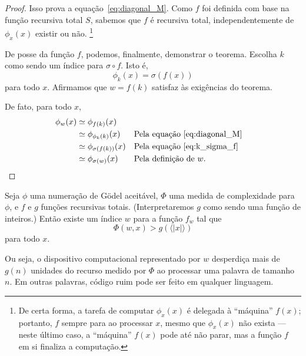 \begin{proof}
    Isso prova a equação~\ref{eq:diagonal_M}.
    Como $f$ foi definida com base na função recursiva total $S$,
    sabemos que $f$ é recursiva total,
    independentemente de $\phi_x(x)$ existir ou não.
    \footnote{
        De certa forma,
        a tarefa de computar $\phi_x(x)$ é delegada à ``máquina'' $f(x)$;
        portanto, $f$ sempre para ao processar $x$,
        mesmo que $\phi_x(x)$ não exista
        --- neste último caso, a ``máquina'' $f(x)$ pode até não parar,
        mas a função $f$ em si finaliza a computação.
    }

    De posse da função $f$,
    podemos, finalmente, demonstrar o teorema.
    Escolha $k$ como sendo um índice para $\sigma \circ f$.
    Isto é,
    \begin{equation}
        \phi_k(x) = \sigma(f(x))
        \label{eq:k_sigma_f}
    \end{equation}
    para todo $x$.
    Afirmamos que $w = f(k)$
    satisfaz às exigências do teorema.

    De fato, para todo $x$,
    \begin{align*}
        \phi_w(x) &\simeq \phi_{f(k)}(x) \\
              &\simeq \phi_{\phi_k(k)}(x) && \text{Pela equação~\ref{eq:diagonal_M}}\\
              &\simeq \phi_{\sigma(f(k))}(x) && \text{Pela equação~\ref{eq:k_sigma_f}}\\
              &\simeq \phi_{\sigma(w)}(x) && \text{Pela definição de $w$.}
    \end{align*}
\end{proof}

\begin{proposition}
    Seja $\phi$ uma numeração de Gödel aceitável,
    $\Phi$ uma medida de complexidade para $\phi$,
    e $f$ e $g$ funções recursivas totais.
    (Interpretaremos $g$ como sendo uma função de inteiros.)
    Então existe um índice $w$ para a função $f_w$ tal que
    \begin{equation*}
        \Phi(w, x) > g(\langle|x|\rangle)
    \end{equation*}
    para todo $x$.
    \label{thm:resource_waste}
\end{proposition}

Ou seja,
o dispositivo computacional representado por $w$
desperdiça mais de $g(n)$ unidades do recurso medido por $\Phi$
ao processar uma palavra de tamanho $n$.
Em outras palavras,
código ruim pode ser feito em qualquer linguagem.

